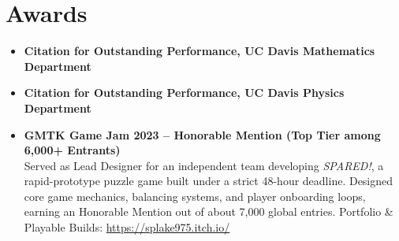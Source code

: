 \documentclass{curriculum-vitae}
\begin{document}
\section*{Awards}
\begin{itemize}
    \item \textbf{Citation for Outstanding Performance, UC Davis Mathematics Department} 
    \item \textbf{Citation for Outstanding Performance, UC Davis Physics Department} 
    \item \textbf{GMTK Game Jam 2023 -- Honorable Mention (Top Tier among 6,000+ Entrants)}\\
    Served as Lead Designer for an independent team developing \emph{SPARED!}, a rapid-prototype puzzle game built under a strict 48-hour deadline. Designed core game mechanics, balancing systems, and player onboarding loops, earning an Honorable Mention out of about 7,000 global entries. 
    \newline Portfolio \& Playable Builds: \url{https://splake975.itch.io/}
\end{itemize}
\end{document}

